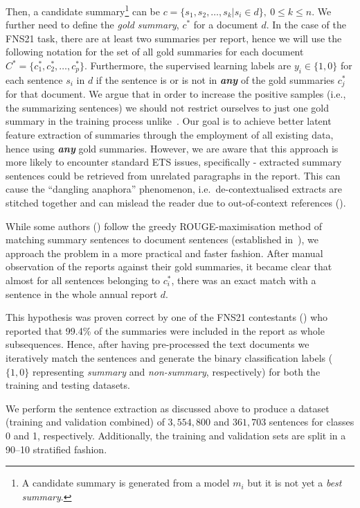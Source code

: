Then, a candidate summary\footnote{
    A candidate summary is generated from a model $m_{i}$ but it is not yet a \emph{best summary}.
} can be $c=\{s_{1}, s_{2}, \dots, s_{k} | s_{i} \in d \}, \ 0 \leq k \leq n$.
We further need to define the \emph{gold summary}, $c^{*}$ for a document $d$.
In the case of the FNS21 task, there are at least two summaries per report, hence we will use the following notation for the set of all gold summaries for each document $C^{*} = \{c^{*}_{1}, c^{*}_{2}, \dots, c^{*}_{p}\}$.
Furthermore, the supervised learning labels are $y_{i} \in \{1,0\}$ for each sentence $s_{i}$ in $d$ if the sentence is or is not in \textbf{\emph{any}} of the gold summaries $c^{*}_{j}$ for that document.
We argue that in order to increase the positive samples (i.e., the summarizing sentences) we should not restrict
ourselves to just one gold summary in the training process unlike~\cite{orzhenovskii-2021-t5}.
Our goal is to achieve better latent feature extraction of summaries through the employment of all existing data, hence using \textbf{\emph{any}} gold summaries.
However, we are aware that this approach is more likely to encounter standard ETS issues, specifically - extracted summary sentences could be retrieved from unrelated paragraphs in the report.
This can cause the \enquote{dangling anaphora} phenomenon, i.e.\ de-contextualised extracts are stitched together and can mislead the reader due to out-of-context references (\cite{lin2009summarization}).

While some authors (\cite{zmandar-etal-2021-joint}) follow the greedy ROUGE-maximisation method of matching summary
sentences to document sentences (established in~\cite{nallapati2017summarunner}), we approach the problem in a
more practical and faster fashion.
After manual observation of the reports against their gold summaries, it became clear that almost for all sentences
belonging to $c^{*}_{i}$, there was an exact match with a sentence in the whole annual report $d$.

This hypothesis was proven correct by one of the FNS21 contestants (\cite{orzhenovskii-2021-t5}) who reported that
99.4\% of the summaries were included in the report as whole subsequences.
Hence, after having pre-processed the text documents we iteratively match the sentences and generate the binary
classification labels ($\{1,0\}$ representing \emph{summary} and \emph{non-summary}, respectively) for both
the training and testing datasets.

We perform the sentence extraction as discussed above to produce a dataset (training and validation combined) of $3,554,800$ and $361,703$ sentences for classes 0 and 1, respectively.
Additionally, the training and validation sets are split in a 90--10 stratified fashion.

